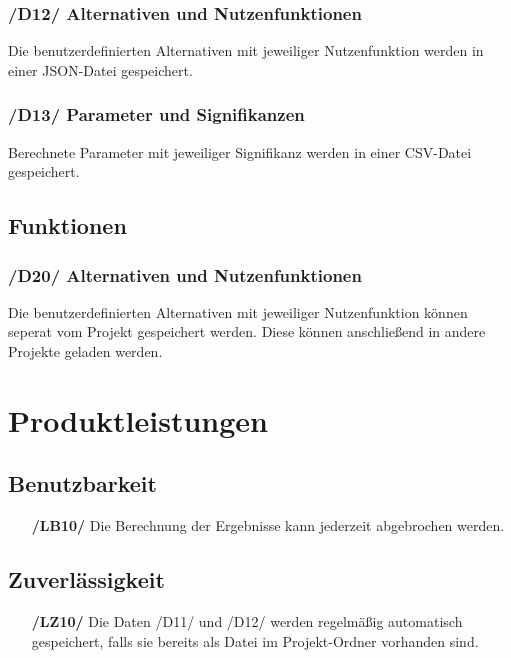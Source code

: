 \documentclass{article}
\begin{document}
\subsubsection*{\textbf{/D12/} Alternativen und Nutzenfunktionen} \label{sec:dd:Alternativen und Nutzenfunktionen}
Die benutzerdefinierten Alternativen mit jeweiliger Nutzenfunktion werden in einer JSON-Datei gespeichert.
\subsubsection*{\textbf{/D13/} Parameter und Signifikanzen} \label{sec:dd:Parameter und Signifikanzen}
Berechnete Parameter mit jeweiliger Signifikanz werden in einer CSV-Datei gespeichert.
\subsection{Funktionen}
\subsubsection*{\textbf{/D20/} Alternativen und Nutzenfunktionen} \label{sec:df:Alternativen und Nutzenfunktionen}
Die benutzerdefinierten Alternativen mit jeweiliger Nutzenfunktion können seperat vom Projekt gespeichert werden. Diese können anschließend in andere Projekte geladen werden.


\clearpage
\section{Produktleistungen}
\subsection{Benutzbarkeit}
\begin{itemize}
    \item[\textbf{/LB10/}] Die Berechnung der Ergebnisse kann jederzeit abgebrochen werden.
\end{itemize}
\subsection{Zuverlässigkeit}
\begin{itemize}
    \item[\textbf{/LZ10/}] Die Daten /D11/ und /D12/ werden regelmäßig automatisch gespeichert, falls sie bereits als Datei im Projekt-Ordner vorhanden sind.
\end{itemize}
\end{document}
